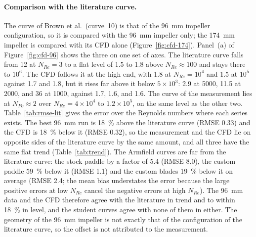 \begin{table}[htbp]
    \centering
    \caption[CFD against the Armfield student data]{Error of the CFD (the 96 and 174~mm impellers of this work) against the three Armfield student curves, for the points with $N_{Re} \geq 4000$. $n$ is the number of points, the overlined quantities are means over the points, and the last column is the RMSE of $\log_{10}N_{Po}$, a measure that does not weight the large low-$N_{Re}$ values.}
    \label{tab:rmse-cfd-arm}
    \small
    \resizebox{\textwidth}{!}{}
\end{table}

\paragraph{Comparison with the literature curve.}
The curve of Brown et al.\ (curve~10) is that of the 96~mm impeller configuration, so it is compared with the 96~mm impeller only; the 174~mm impeller is compared with its CFD alone (Figure~\ref{fig:cfd-174}). Panel~(a) of Figure~\ref{fig:cfd-96} shows the three on one set of axes. The literature curve falls from 12 at $N_{Re} = 3$ to a flat level of 1.5 to 1.8 above $N_{Re} \approx 100$ and stays there to $10^{6}$. The CFD follows it at the high end, with 1.8 at $N_{Re} = 10^{4}$ and 1.5 at $10^{5}$ against 1.7 and 1.8, but it rises far above it below $5\times10^{3}$: 2.9 at 5000, 11.5 at 2000, and 36 at 1000, against 1.7, 1.6, and 1.6. The curve of the measurement lies at $N_{Po} \approx 2$ over $N_{Re} = 4\times10^{4}$ to $1.2\times10^{5}$, on the same level as the other two. Table~\ref{tab:rmse-lit} gives the error over the Reynolds numbers where each series exists. The best 96~mm run is 18~\% above the literature curve (RMSE 0.33) and the CFD is 18~\% below it (RMSE 0.32), so the measurement and the CFD lie on opposite sides of the literature curve by the same amount, and all three have the same flat trend (Table~\ref{tab:trend}). The Armfield curves are far from the literature curve: the stock paddle by a factor of 5.4 (RMSE 8.0), the custom paddle 59~\% below it (RMSE 1.1) and the custom blades 19~\% below it on average (RMSE 2.4; the mean bias understates the error because the large positive errors at low $N_{Re}$ cancel the negative errors at high $N_{Re}$). The 96~mm data and the CFD therefore agree with the literature in trend and to within 18~\% in level, and the student curves agree with none of them in either. The geometry of the 96~mm impeller is not exactly that of the configuration of the literature curve, so the offset is not attributed to the measurement. %

